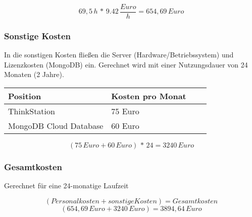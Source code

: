 	\[ 69,5\,h\,*\,9.42\,\frac{Euro}{h} = 654,69\,Euro \]

	\newpage

	\subsubsection{Sonstige Kosten}
	In die sonstigen Kosten fließen die Server (Hardware/Betriebssystem) und Lizenzkosten (MongoDB) ein. Gerechnet wird mit einer Nutzungsdauer von 24 Monaten (2 Jahre).\\

	\begin{table}[htp]

		\begin{center}
			\begin{tabular}{llll} \toprule
				Position & Kosten pro Monat \\ \bottomrule
				ThinkStation & 75 Euro \\
				MongoDB Cloud Database & 60 Euro \\ \bottomrule
			\end{tabular}
		\end{center}
	\end{table}
	
	\[ (75\,Euro + 60\,Euro)\,*\,24 = 3240\,Euro \]

	\subsubsection{Gesamtkosten}
	\label{kosten}
	Gerechnet für eine 24-monatige Laufzeit
		
	\[ (Personalkosten + sonstige Kosten) = Gesamtkosten \]
	\[ (654,69\,Euro + 3240\,Euro) = 3894,64\,Euro \]



